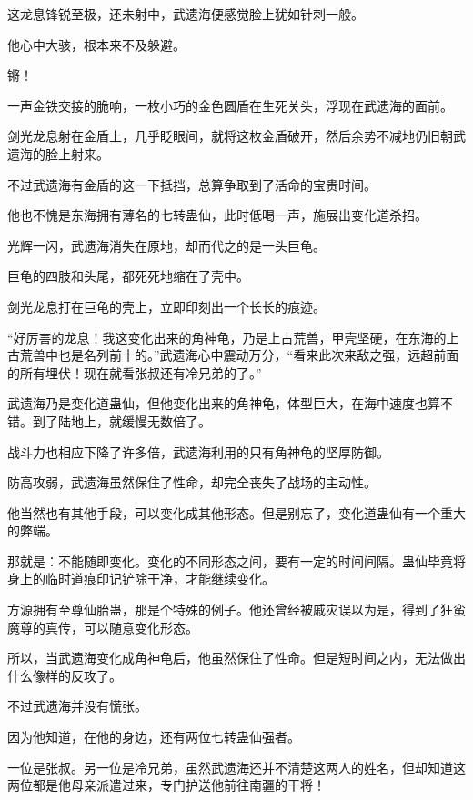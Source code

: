 
\begin{this_body}

这龙息锋锐至极，还未射中，武遗海便感觉脸上犹如针刺一般。

他心中大骇，根本来不及躲避。

锵！

一声金铁交接的脆响，一枚小巧的金色圆盾在生死关头，浮现在武遗海的面前。

剑光龙息射在金盾上，几乎眨眼间，就将这枚金盾破开，然后余势不减地仍旧朝武遗海的脸上射来。

不过武遗海有金盾的这一下抵挡，总算争取到了活命的宝贵时间。

他也不愧是东海拥有薄名的七转蛊仙，此时低喝一声，施展出变化道杀招。

光辉一闪，武遗海消失在原地，却而代之的是一头巨龟。

巨龟的四肢和头尾，都死死地缩在了壳中。

剑光龙息打在巨龟的壳上，立即印刻出一个长长的痕迹。

“好厉害的龙息！我这变化出来的角神龟，乃是上古荒兽，甲壳坚硬，在东海的上古荒兽中也是名列前十的。”武遗海心中震动万分，“看来此次来敌之强，远超前面的所有埋伏！现在就看张叔还有冷兄弟的了。”

武遗海乃是变化道蛊仙，但他变化出来的角神龟，体型巨大，在海中速度也算不错。到了陆地上，就缓慢无数倍了。

战斗力也相应下降了许多倍，武遗海利用的只有角神龟的坚厚防御。

防高攻弱，武遗海虽然保住了性命，却完全丧失了战场的主动性。

他当然也有其他手段，可以变化成其他形态。但是别忘了，变化道蛊仙有一个重大的弊端。

那就是：不能随即变化。变化的不同形态之间，要有一定的时间间隔。蛊仙毕竟将身上的临时道痕印记铲除干净，才能继续变化。

方源拥有至尊仙胎蛊，那是个特殊的例子。他还曾经被戚灾误以为是，得到了狂蛮魔尊的真传，可以随意变化形态。

所以，当武遗海变化成角神龟后，他虽然保住了性命。但是短时间之内，无法做出什么像样的反攻了。

不过武遗海并没有慌张。

因为他知道，在他的身边，还有两位七转蛊仙强者。

一位是张叔。另一位是冷兄弟，虽然武遗海还并不清楚这两人的姓名，但却知道这两位都是他母亲派遣过来，专门护送他前往南疆的干将！


\end{this_body}
